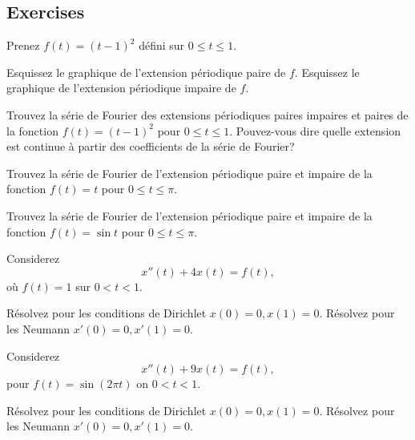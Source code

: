 \subsection{Exercises}

\begin{exercise}
Prenez $f(t) = {(t-1)}^2$ défini sur $0 \leq t \leq 1$.
\begin{tasks}
\task Esquissez le graphique de l'extension périodique paire de $ f $.
\task Esquissez le graphique de l'extension périodique impaire de $ f $.
\end{tasks}
\end{exercise}

\begin{exercise}
Trouvez la série de Fourier des extensions périodiques  paires impaires et paires
de la fonction $f(t) = {(t-1)}^2$ pour $0 \leq t \leq 1$.
Pouvez-vous dire quelle extension est continue à partir des coefficients de la série de Fourier?
\end{exercise}

\begin{exercise}
Trouvez la série de Fourier de l'extension périodique paire et impaire de
la fonction $f(t) = t$ pour $0 \leq t \leq \pi$.
\end{exercise}

\begin{exercise}
Trouvez la série de Fourier de l'extension périodique paire et impaire de
la fonction $f(t) = \sin t$ pour $0 \leq t \leq \pi$.
\end{exercise}

\begin{exercise}
\pagebreak[2]
Considerez
\begin{equation*}
x''(t) + 4 x(t) = f(t) ,
\end{equation*}
où $f(t) = 1$ sur $0 < t < 1$.
\begin{tasks}
\task Résolvez pour les conditions de Dirichlet $x(0)=0, x(1) = 0$.
\task Résolvez pour les Neumann  $x'(0)=0, x'(1) = 0$.
\end{tasks}
\end{exercise}

\begin{exercise}
Considerez
\begin{equation*}
x''(t) + 9 x(t) = f(t) ,
\end{equation*}
pour $f(t) = \sin (2\pi t)$ on $0 < t < 1$.
\begin{tasks}
\task Résolvez pour les conditions de Dirichlet  $x(0)=0, x(1) = 0$.
\task Résolvez pour les Neumann  $x'(0)=0, x'(1) = 0$.
\end{tasks}
\end{exercise}

